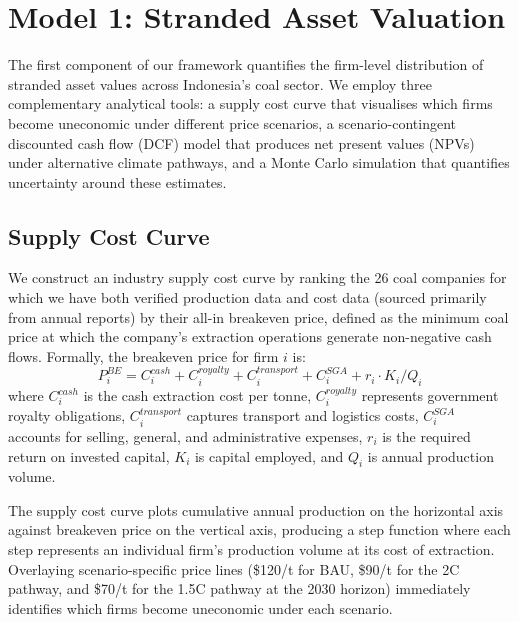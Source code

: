 
\section{Model 1: Stranded Asset Valuation}
\label{sec:model1}

The first component of our framework quantifies the firm-level distribution of stranded asset values across Indonesia's coal sector. We employ three complementary analytical tools: a supply cost curve that visualises which firms become uneconomic under different price scenarios, a scenario-contingent discounted cash flow (DCF) model that produces net present values (NPVs) under alternative climate pathways, and a Monte Carlo simulation that quantifies uncertainty around these estimates.

\subsection{Supply Cost Curve}
\label{subsec:supply_cost}

We construct an industry supply cost curve by ranking the 26 coal companies for which we have both verified production data and cost data (sourced primarily from annual reports) by their all-in breakeven price, defined as the minimum coal price at which the company's extraction operations generate non-negative cash flows. Formally, the breakeven price for firm $i$ is:
\begin{equation}
\label{eq:breakeven}
P_i^{BE} = C_i^{cash} + C_i^{royalty} + C_i^{transport} + C_i^{SGA} + r_i \cdot K_i / Q_i
\end{equation}
where $C_i^{cash}$ is the cash extraction cost per tonne, $C_i^{royalty}$ represents government royalty obligations, $C_i^{transport}$ captures transport and logistics costs, $C_i^{SGA}$ accounts for selling, general, and administrative expenses, $r_i$ is the required return on invested capital, $K_i$ is capital employed, and $Q_i$ is annual production volume.

The supply cost curve plots cumulative annual production on the horizontal axis against breakeven price on the vertical axis, producing a step function where each step represents an individual firm's production volume at its cost of extraction. Overlaying scenario-specific price lines (\$120/t for BAU, \$90/t for the 2\textdegree C pathway, and \$70/t for the 1.5\textdegree C pathway at the 2030 horizon) immediately identifies which firms become uneconomic under each scenario.

